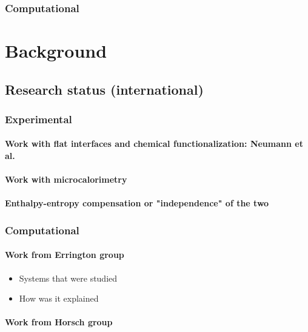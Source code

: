 \documentclass[a4paper,12pt,single,pdftex]{article}
\begin{document}
\label{ID_734735562}\subsubsection{Computational}

\label{ID_1110611260}\section{Background}

\label{ID_1392626561}\subsection{Research status (international)}

\label{ID_869146050}\subsubsection{Experimental}

\label{ID_121688724}\paragraph{Work with flat interfaces and chemical functionalization: Neumann et al.}

\label{ID_1314084600}\paragraph{Work with microcalorimetry}

\label{ID_30644458}\paragraph{Enthalpy-entropy compensation or "independence" of the two}

\label{ID_1521593594}\subsubsection{Computational}

\label{ID_1690050024}\paragraph{Work from Errington group}

\begin{itemize}
\label{ID_473109498}\item Systems that were studied
\label{ID_1487682070}\item How was it explained
\end{itemize}
\label{ID_473109498}\label{ID_1487682070}\label{ID_980454220}\paragraph{Work from Horsch group}
\end{document}
